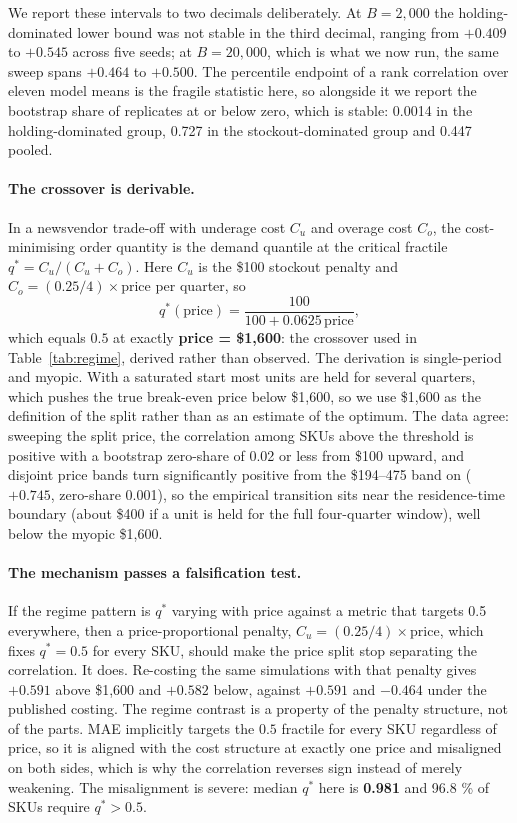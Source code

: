 \documentclass[11pt]{article}
\begin{document}
We report these intervals to two decimals deliberately. At $B = 2{,}000$ the
holding-dominated lower bound was not stable in the third decimal, ranging from
$+0.409$ to $+0.545$ across five seeds; at $B = 20{,}000$, which is what we now
run, the same sweep spans $+0.464$ to $+0.500$. The percentile endpoint of a
rank correlation over eleven model means is the fragile statistic here, so
alongside it we report the bootstrap share of replicates at or below zero, which
is stable: 0.0014 in the holding-dominated group, 0.727 in the
stockout-dominated group and 0.447 pooled.

\paragraph{The crossover is derivable.} In a newsvendor trade-off with underage
cost $C_u$ and overage cost $C_o$, the cost-minimising order quantity is the
demand quantile at the critical fractile $q^\ast = C_u/(C_u+C_o)$. Here $C_u$
is the \$100 stockout penalty and $C_o = (0.25/4)\times\text{price}$ per
quarter, so
\begin{equation*}
q^\ast(\text{price}) = \frac{100}{100 + 0.0625\,\text{price}},
\end{equation*}
which equals $0.5$ at exactly \textbf{price = \$1{,}600}: the crossover used
in Table~\ref{tab:regime}, derived rather than observed. The derivation is
single-period and myopic. With a saturated start most units are held for
several quarters, which pushes the true break-even price below \$1{,}600, so
we use \$1{,}600 as the definition of the split rather than as an estimate of
the optimum. The data agree: sweeping the split price, the correlation among
SKUs above the threshold is positive with a bootstrap zero-share of 0.02 or
less from \$100 upward, and disjoint price bands turn significantly positive
from the \$194--475 band on ($+0.745$, zero-share 0.001), so the empirical
transition sits near the residence-time boundary (about \$400 if a unit is
held for the full four-quarter window), well below the myopic \$1{,}600.

\paragraph{The mechanism passes a falsification test.} If the regime pattern
is $q^\ast$ varying with price against a metric that targets 0.5 everywhere,
then a price-proportional penalty, $C_u = (0.25/4)\times\text{price}$, which
fixes $q^\ast = 0.5$ for every SKU, should make the price split stop
separating the correlation. It does. Re-costing the same simulations with that
penalty gives $+0.591$ above \$1{,}600 and $+0.582$ below, against $+0.591$
and $-0.464$ under the published costing. The regime contrast is a property of
the penalty structure, not of the parts. MAE implicitly targets the $0.5$
fractile for every SKU regardless of price, so it is aligned with the cost
structure at exactly one price and misaligned on both sides, which is why the
correlation reverses sign instead of merely weakening. The misalignment is
severe: median $q^\ast$ here is \textbf{0.981} and 96.8 \% of SKUs require
$q^\ast > 0.5$.
\end{document}
